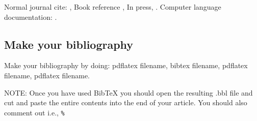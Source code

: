 \documentclass[reprint]{JASAnew}
\begin{document}
Normal journal cite: \citep{joursamp1},
 Book reference \citep{booksamp1},
In press, \citep{inpress3}. 
Computer language documentation:
\citep{sampcode2}.

\subsection{Make your bibliography}
Make your bibliography by doing: pdflatex filename,  bibtex filename,
pdflatex filename, pdflatex filename.


NOTE:
Once you have used BibTeX you
should open the resulting .bbl file and cut and paste the entire contents 
into the end of your article.
You should also comment out
\verb++ i.e.,
\verb+%+




\end{document}
